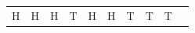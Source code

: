 {\begin{center}
\begin{xtabular*}{\mytablewidth}[t]{|p{10\mystarwidth}|p{10\mystarwidth}|p{10\mystarwidth}|p{10\mystarwidth}|p{10\mystarwidth}|p{10\mystarwidth}|p{10\mystarwidth}|p{10\mystarwidth}|p{10\mystarwidth}|p{10\mystarwidth}|}
        H &
    
    
        H &
    
    
        H &
    
    
        T &
    
    
        H &
    
    
        H &
    
    
        T &
    
    
        T &
    
    
        T%
     \tabularnewline{}
    

\end{xtabular*}
\end{center}}
